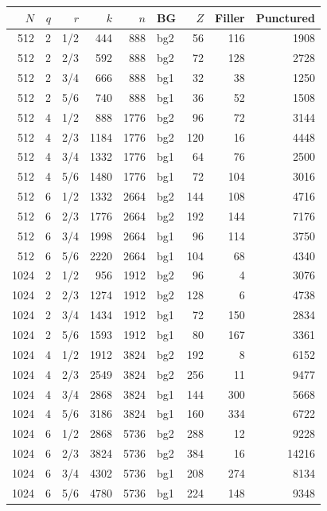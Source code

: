 \begin{longtable}{@{}rrrrrlrrr@{}}\toprule
$N$ & $q$ & $r$ & $k$ & $n$ & BG & $Z$ & Filler & Punctured\\\midrule\endhead
512 & 2 & 1/2 & 444 & 888 & bg2 & 56 & 116 & 1908\\
512 & 2 & 2/3 & 592 & 888 & bg2 & 72 & 128 & 2728\\
512 & 2 & 3/4 & 666 & 888 & bg1 & 32 & 38 & 1250\\
512 & 2 & 5/6 & 740 & 888 & bg1 & 36 & 52 & 1508\\
512 & 4 & 1/2 & 888 & 1776 & bg2 & 96 & 72 & 3144\\
512 & 4 & 2/3 & 1184 & 1776 & bg2 & 120 & 16 & 4448\\
512 & 4 & 3/4 & 1332 & 1776 & bg1 & 64 & 76 & 2500\\
512 & 4 & 5/6 & 1480 & 1776 & bg1 & 72 & 104 & 3016\\
512 & 6 & 1/2 & 1332 & 2664 & bg2 & 144 & 108 & 4716\\
512 & 6 & 2/3 & 1776 & 2664 & bg2 & 192 & 144 & 7176\\
512 & 6 & 3/4 & 1998 & 2664 & bg1 & 96 & 114 & 3750\\
512 & 6 & 5/6 & 2220 & 2664 & bg1 & 104 & 68 & 4340\\
1024 & 2 & 1/2 & 956 & 1912 & bg2 & 96 & 4 & 3076\\
1024 & 2 & 2/3 & 1274 & 1912 & bg2 & 128 & 6 & 4738\\
1024 & 2 & 3/4 & 1434 & 1912 & bg1 & 72 & 150 & 2834\\
1024 & 2 & 5/6 & 1593 & 1912 & bg1 & 80 & 167 & 3361\\
1024 & 4 & 1/2 & 1912 & 3824 & bg2 & 192 & 8 & 6152\\
1024 & 4 & 2/3 & 2549 & 3824 & bg2 & 256 & 11 & 9477\\
1024 & 4 & 3/4 & 2868 & 3824 & bg1 & 144 & 300 & 5668\\
1024 & 4 & 5/6 & 3186 & 3824 & bg1 & 160 & 334 & 6722\\
1024 & 6 & 1/2 & 2868 & 5736 & bg2 & 288 & 12 & 9228\\
1024 & 6 & 2/3 & 3824 & 5736 & bg2 & 384 & 16 & 14216\\
1024 & 6 & 3/4 & 4302 & 5736 & bg1 & 208 & 274 & 8134\\
1024 & 6 & 5/6 & 4780 & 5736 & bg1 & 224 & 148 & 9348\\
\bottomrule\end{longtable}

